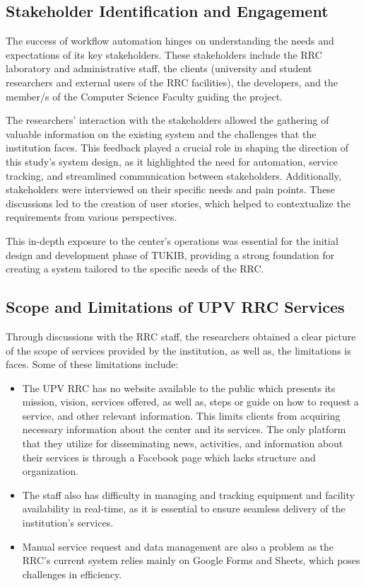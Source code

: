 \subsection{Stakeholder Identification and Engagement}
The success of workflow automation hinges on understanding the needs and expectations of its key stakeholders. These stakeholders include the RRC laboratory and administrative staff, the clients (university and student researchers and external users of the RRC facilities), the developers, and the member/s of the Computer Science Faculty guiding the project.

The researchers' interaction with the stakeholders allowed the gathering of valuable information on the existing system and the challenges that the institution faces. This feedback played a crucial role in shaping the direction of this study's system design, as it highlighted the need for automation, service tracking, and streamlined communication between stakeholders. Additionally, stakeholders were interviewed on their specific needs and pain points. These discussions led to the creation of user stories, which helped to contextualize the requirements from various perspectives. 

This in-depth exposure to the center’s operations was essential for the initial design and development phase of TUKIB, providing a strong foundation for creating a system tailored to the specific needs of the RRC.

\subsection{Scope and Limitations of UPV RRC Services}
Through discussions with the RRC staff, the researchers obtained a clear picture of the scope of services provided by the institution, as well as, the limitations is faces. Some of these limitations include:

\begin{itemize}
	\item The UPV RRC has no website available to the public which presents its mission, vision, services offered, as well as, steps or guide on how to request a service, and other relevant information. This limits clients from acquiring necessary information about the center and its services. The only platform that they utilize for disseminating news, activities, and information about their services is through a Facebook page which lacks structure and organization.
	\item The staff also has difficulty in managing and tracking equipment and facility availability in real-time, as it is essential to ensure seamless delivery of the institution's services.
	\item Manual service request and data management are also a problem as the RRC’s current system relies mainly on Google Forms and Sheets, which poses challenges in efficiency.
\end{itemize}

